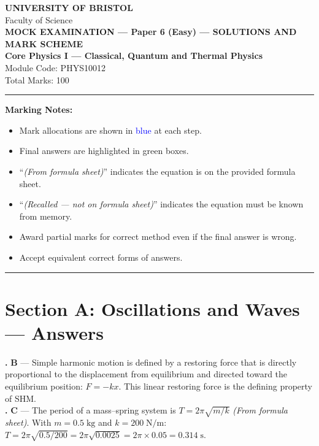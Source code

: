\documentclass[12pt,a4paper]{article}
\newcommand{\fromsheet}{\textit{(From formula sheet)}}
\newcommand{\recalled}{\textit{(Recalled --- not on formula sheet)}}
\newcounter{mcqcounter}
\newcommand{\mcqanswer}[2]{%
  \stepcounter{mcqcounter}%
  \noindent\textbf{\themcqcounter.} \textbf{#1} --- #2\\[0.2cm]%
}
\begin{document}
\begin{center}
{\Large\textbf{UNIVERSITY OF BRISTOL}}\\[0.3cm]
{\large Faculty of Science}\\[0.5cm]
{\Large\textbf{MOCK EXAMINATION --- Paper 6 (Easy) --- SOLUTIONS AND MARK SCHEME}}\\[0.3cm]
{\large\textbf{Core Physics I --- Classical, Quantum and Thermal Physics}}\\[0.2cm]
{\large Module Code: PHYS10012}\\[0.5cm]
{\large Total Marks: 100}\\[0.3cm]
\end{center}

\noindent\rule{\textwidth}{0.4pt}

\vspace{0.3cm}
\noindent\textbf{Marking Notes:}
\begin{itemize}[itemsep=0.1cm]
\item Mark allocations are shown in \textcolor{blue}{blue} at each step.
\item Final answers are highlighted in green boxes.
\item ``\fromsheet'' indicates the equation is on the provided formula sheet.
\item ``\recalled'' indicates the equation must be known from memory.
\item Award partial marks for correct method even if the final answer is wrong.
\item Accept equivalent correct forms of answers.
\end{itemize}

\noindent\rule{\textwidth}{0.4pt}
\newpage

\section*{Section A: Oscillations and Waves --- Answers}

\setcounter{mcqcounter}{0}

\mcqanswer{B}{Simple harmonic motion is defined by a restoring force that is directly proportional to the displacement from equilibrium and directed toward the equilibrium position: $F = -kx$. This linear restoring force is the defining property of SHM.}

\mcqanswer{C}{The period of a mass--spring system is $T = 2\pi\sqrt{m/k}$ \fromsheet. With $m = 0.5\;\text{kg}$ and $k = 200\;\text{N/m}$: $T = 2\pi\sqrt{0.5/200} = 2\pi\sqrt{0.0025} = 2\pi\times 0.05 = 0.314\;\text{s}$.}
\end{document}
